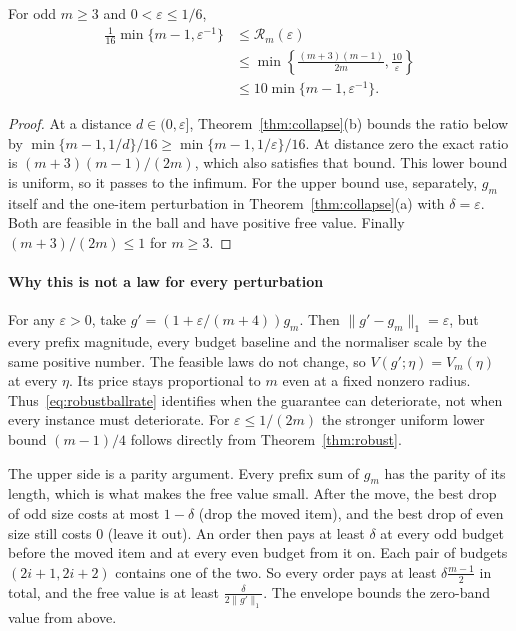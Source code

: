 \begin{corollary}
\label{cor:robustball}
For odd $m\ge3$ and $0<\varepsilon\le1/6$,
\begin{align}
\frac1{16}\min\{m-1,\varepsilon^{-1}\}
&\le \mathcal R_m(\varepsilon)\nonumber\\
&\le\min\left\{\frac{(m+3)(m-1)}{2m},\frac{10}{\varepsilon}\right\}\nonumber\\
&\le10\min\{m-1,\varepsilon^{-1}\}.
\label{eq:robustballrate}
\end{align}
\end{corollary}
\begin{proof}
At a distance $d\in(0,\varepsilon]$, Theorem~\ref{thm:collapse}(b) bounds the ratio below by
$\min\{m-1,1/d\}/16\ge\min\{m-1,1/\varepsilon\}/16$.
At distance zero the exact ratio is $(m+3)(m-1)/(2m)$, which also satisfies that bound.
This lower bound is uniform, so it passes to the infimum.
For the upper bound use, separately, $g_m$ itself and the one-item perturbation in
Theorem~\ref{thm:collapse}(a) with $\delta=\varepsilon$. Both are feasible in the ball and
have positive free value. Finally $(m+3)/(2m)\le1$ for $m\ge3$.
\end{proof}

\paragraph{Why this is not a law for every perturbation}
For any $\varepsilon>0$, take $g'=(1+\varepsilon/(m+4))g_m$.
Then $\|g'-g_m\|_1=\varepsilon$, but every prefix magnitude, every budget baseline and the
normaliser scale by the same positive number. The feasible laws do not change, so
$V(g';\eta)=V_m(\eta)$ at every $\eta$. Its price stays proportional to $m$ even at a fixed
nonzero radius. Thus~\eqref{eq:robustballrate} identifies when the guarantee can deteriorate,
not when every instance must deteriorate. For $\varepsilon\le1/(2m)$ the stronger uniform
lower bound $(m-1)/4$ follows directly from Theorem~\ref{thm:robust}.

The upper side is a parity argument. Every prefix sum of $g_{m}$ has the parity of its
length, which is what makes the free value small. After the move, the best drop of odd size
costs at most $1-\delta$ (drop the moved item), and the best drop of even size still costs
$0$ (leave it out). An order then pays at least $\delta$ at every odd budget before the moved
item and at every even budget from it on. Each pair of budgets $(2i+1,2i+2)$ contains one of
the two. So every order pays at least $\delta\frac{m-1}{2}$ in total, and the free value is at
least $\frac{\delta}{2\|g'\|_{1}}$. The envelope bounds the zero-band value from above.

